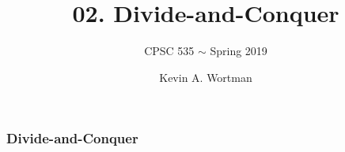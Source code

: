 \documentclass{beamer}
\title{02. Divide-and-Conquer}
\subtitle{CPSC 535 $\sim$ Spring 2019}
\author{Kevin A. Wortman}
\institute{California State University, Fullerton}
\date{February 4, 2019 \stanza

\texttt{[image: by]} \\

{\tiny
This work is licensed under a
\href{http://creativecommons.org/licenses/by/4.0/}{Creative Commons Attribution 4.0 International License}.
}}
\begin{document}
\begin{frame}
  \titlepage
\end{frame}

\begin{frame} \frametitle{Divide-and-Conquer}

\end{frame}
\end{document}
